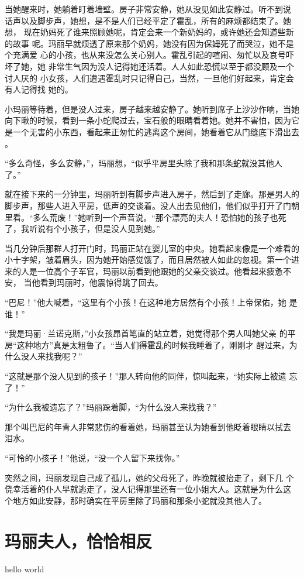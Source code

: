 \documentclass[winfonts,UTF8,cs4size,a4paper,hyperref,fancyhdr,fntef]{ctexbook}
\begin{document}
当她醒来时，她躺着盯着墙壁。房子非常安静，她从没见如此安静过。听不到说
话声以及脚步声，她想，是不是人们已经平定了霍乱，所有的麻烦都结束了。她想，
现在奶妈死了谁来照顾她呢，肯定会来一个新奶妈的，或许她还会知道些新的故事
呢。玛丽早就烦透了原来那个奶妈，她没有因为保姆死了而哭泣，她不是个充满爱
心的小孩，也从来没怎么关心别人。霍乱引起的喧闹、匆忙以及哀号吓坏了她，她
非常生气因为没人记得她还活着。人人如此恐慌以至于都没顾及一个讨人厌的
小女孩，人们遭遇霍乱时只记得自己，当然，一旦他们好起来，肯定会有人记得找
她的。

小玛丽等待着，但是没人过来，房子越来越安静了。她听到席子上沙沙作响，当她
向下瞅的时候，看到一条小蛇爬过去，宝石般的眼睛看着她。她并不害怕，因为它
是一个无害的小东西，看起来正匆忙的逃离这个房间，她看着它从门缝底下滑出去
。

``多么奇怪，多么安静，''，玛丽想，``似乎平房里头除了我和那条蛇就没其他人
了。''

就在接下来的一分钟里，玛丽听到有脚步声进入房子，然后到了走廊。那是男人的
脚步声，那些人进入平房，低声的交谈着。没人出去见他们，他们似乎打开了门朝
里看。``多么荒废！''她听到一个声音说。``那个漂亮的夫人！恐怕她的孩子也死
了，我听说有个小孩子，但是没人见到她。''

当几分钟后那群人打开门时，玛丽正站在婴儿室的中央。她看起来像是一个难看的
小十字架，皱着眉头，因为她开始感觉饿了，而且居然被人如此的忽视。第一个进
来的人是一位高个子军官，玛丽以前看到他跟她的父亲交谈过。他看起来疲惫不安，
当他看到玛丽时，他震惊得跳了回去。

``巴尼！''他大喊着，``这里有个小孩！在这种地方居然有个小孩！上帝保佑，她
是谁！''

``我是玛丽·兰诺克斯，''小女孩昂首笔直的站立着，她觉得那个男人叫她父亲
的平房``这种地方''真是太粗鲁了。``当人们得霍乱的时候我睡着了，刚刚才
醒过来，为什么没人来找我呢？''

``这就是那个没人见到的孩子！''那人转向他的同伴，惊叫起来，``她实际上被遗
忘了！''

``为什么我被遗忘了？''玛丽跺着脚，``为什么没人来找我？''

那个叫巴尼的年青人非常悲伤的看着她，玛丽甚至认为她看到他眨着眼睛以拭去
泪水。

``可怜的小孩子！''他说，``没一个人留下来找你。''

突然之间，玛丽发现自己成了孤儿，她的父母死了，昨晚就被抬走了，剩下几
个侥幸活着的仆人早就逃走了，没人记得那里还有一位小姐大人。这就是为什么这
个地方如此安静，那时确实在平房里除了玛丽和那条小蛇就没其他人了。

\chapter{玛丽夫人，恰恰相反}
hello world
\end{document}
